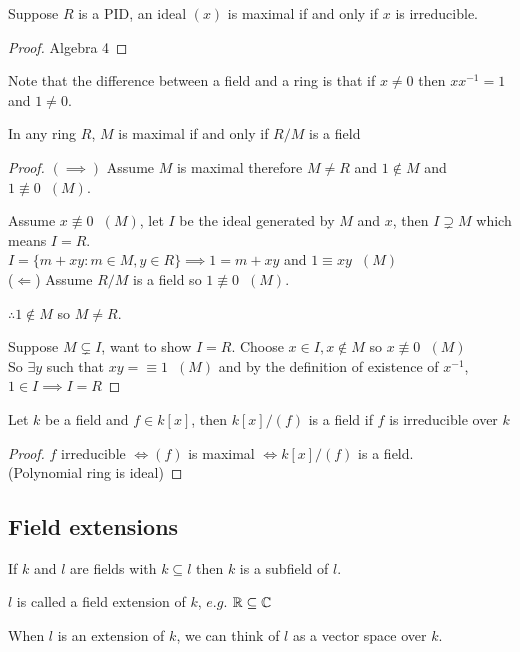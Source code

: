 \documentclass[11pt]{article}
\begin{document}
\begin{prop}
	Suppose $R$ is a PID, an ideal $(x)$ is maximal if and only if $x$ is irreducible.
\end{prop}
\begin{proof}
Algebra 4
\end{proof}
$ $\\[-1em]
Note that the difference between a field and a ring is that if $x \neq 0$ then $xx^{-1} = 1$ and $1 \neq 0$.
\begin{prop}
In any ring $R$, $M$ is maximal if and only if $R/M$ is a field
\end{prop}
\begin{proof}
	$(\implies)$ Assume $M$ is maximal therefore $M \neq R$ and $1 \not \in M$ and $1 \not \equiv 0 \hspace{7pt} (M)$.


	Assume $x \not \equiv 0 \hspace{7pt}(M)$, let $I$ be the ideal generated by $M$ and $x$, then $ I \supsetneq M$ which means $I=R$.
	$ $\\[1em]
	$I = \{ m + xy : m \in M, y \in R \} \implies 1 = m + xy $ and $ 1 \equiv xy \hspace{7pt}(M)$
	$ $\\[1em]
	($\Longleftarrow$) Assume $R/M$ is a field so $1 \not \equiv 0 \hspace{7pt} (M)$.

	$\therefore 1 \not \in M$ so $M \neq R$.

	Suppose $M \subsetneq I$, want to show $I=R$.
	Choose $x \in I, x \not \in M $ so $x \not \equiv 0 \hspace{7pt }(M)$
	$ $\\[0.5em]
	So $\exists y $ such that $xy = \equiv 1 \hspace{7pt} (M) $ and by the definition of existence of $x^{-1}$, $1 \in I \implies I = R$
\end{proof}


\begin{cor}
	Let $k$ be a field and $f \in k[x]$, then $k[x]/(f)$ is a field if $f$ is irreducible over $k$
\end{cor}
\begin{proof}
	$f $ irreducible $\iff (f) $ is maximal $ \iff k[x]/(f) $ is a field.\\
	(Polynomial ring is ideal)
\end{proof}

\subsection{Field extensions}
\begin{defn}
If $k $ and $l$ are fields with $k \subseteq l$ then $k$ is a subfield of $l$. 

$l$ is called a field extension of $k$, $e.g.$ $\mathbb{R} \subseteq \mathbb{C}$ 
\end{defn}
When $l$ is an extension of $k$, we can think of $l$ as a vector space over $k$.
\end{document}
